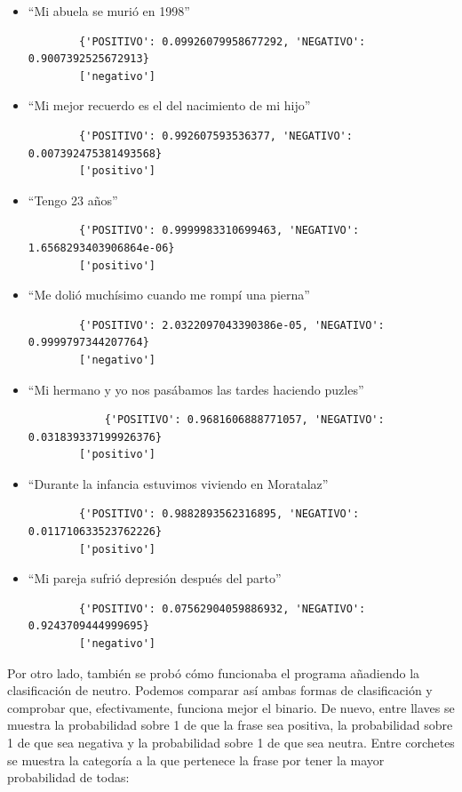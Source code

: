 \begin{itemize}
	\item ``Mi abuela se murió en 1998''
	\begin{verbatim}
		{'POSITIVO': 0.09926079958677292, 'NEGATIVO': 0.9007392525672913}
		['negativo']
	\end{verbatim}
	\item ``Mi mejor recuerdo es el del nacimiento de mi hijo''
	\begin{verbatim}
		{'POSITIVO': 0.992607593536377, 'NEGATIVO': 0.007392475381493568}
		['positivo']
	\end{verbatim}
	\item ``Tengo 23 años''
	\begin{verbatim}
		{'POSITIVO': 0.9999983310699463, 'NEGATIVO': 1.6568293403906864e-06}
		['positivo']
	\end{verbatim}
	\item ``Me dolió muchísimo cuando me rompí una pierna''
	\begin{verbatim}
		{'POSITIVO': 2.0322097043390386e-05, 'NEGATIVO': 0.9999797344207764}
		['negativo']
	\end{verbatim}
	\item ``Mi hermano y yo nos pasábamos las tardes haciendo puzles''
	\begin{verbatim}
			{'POSITIVO': 0.9681606888771057, 'NEGATIVO': 0.031839337199926376}
		['positivo']
	\end{verbatim}
	\item ``Durante la infancia estuvimos viviendo en Moratalaz''
	\begin{verbatim}
		{'POSITIVO': 0.9882893562316895, 'NEGATIVO': 0.011710633523762226}
		['positivo']
	\end{verbatim}
	\item ``Mi pareja sufrió depresión después del parto''
	\begin{verbatim}
		{'POSITIVO': 0.07562904059886932, 'NEGATIVO': 0.9243709444999695}
		['negativo']
	\end{verbatim}

\end{itemize}

Por otro lado, también se probó cómo funcionaba el programa añadiendo la clasificación de neutro. Podemos comparar así ambas formas de clasificación y comprobar que, efectivamente, funciona mejor el binario. De nuevo, entre llaves se muestra la probabilidad sobre 1 de que la frase sea positiva, la probabilidad sobre 1 de que sea negativa y la probabilidad sobre 1 de que sea neutra. Entre corchetes se muestra la categoría a la que pertenece la frase por tener la mayor probabilidad de todas:

